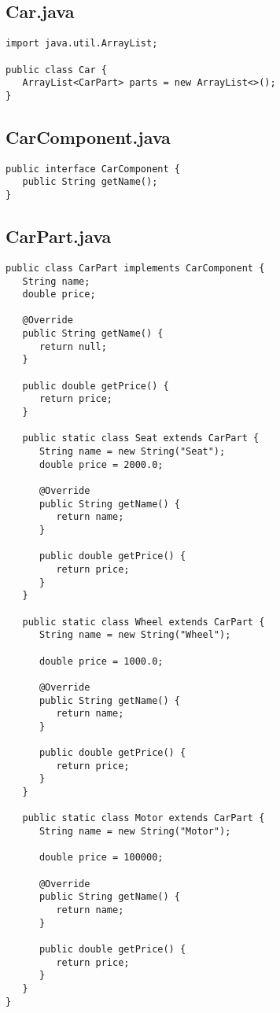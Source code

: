 \documentclass[12pt,a4paper,oneside,ngerman]{article}
\begin{document}
\subsection*{Car.java}
\begin{lstlisting}
import java.util.ArrayList;

public class Car {
   ArrayList<CarPart> parts = new ArrayList<>();
}

\end{lstlisting}

\subsection*{CarComponent.java}
\begin{lstlisting}
public interface CarComponent {
   public String getName();
}

\end{lstlisting}

\subsection*{CarPart.java}
\begin{lstlisting}
public class CarPart implements CarComponent {
   String name;
   double price;

   @Override
   public String getName() {
      return null;
   }

   public double getPrice() {
      return price;
   }

   public static class Seat extends CarPart {
      String name = new String("Seat");
      double price = 2000.0;

      @Override
      public String getName() {
         return name;
      }

      public double getPrice() {
         return price;
      }
   }

   public static class Wheel extends CarPart {
      String name = new String("Wheel");

      double price = 1000.0;

      @Override
      public String getName() {
         return name;
      }

      public double getPrice() {
         return price;
      }
   }

   public static class Motor extends CarPart {
      String name = new String("Motor");

      double price = 100000;

      @Override
      public String getName() {
         return name;
      }

      public double getPrice() {
         return price;
      }
   }
}

\end{lstlisting}
\newpage
\end{document}
